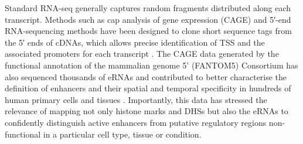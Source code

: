 Standard RNA-seq generally captures random fragments distributed along each transcript. Methods such as cap analysis of gene expression (CAGE) and 5′-end RNA-sequencing methods have been designed to clone short sequence tags from the 5′ ends of cDNAs, which allows precise identification of TSS and the associated promoters for each transcript \parencite{Yamashita2011,FANTOM2014}. The CAGE data generated by the functional annotation of the mammalian genome 5' (FANTOM5) Consortium has also sequenced thousands of eRNAs and contributed to better characterise the definition of enhancers and their spatial and temporal specificity in hundreds of human primary cells and tissues \parencite{Andersson2014}. Importantly, this data has stressed the relevance of mapping not only histone marks and DHSs but also the eRNAs to confidently distinguish active enhancers from putative regulatory regions non-functional in a particular cell type, tissue or condition.


